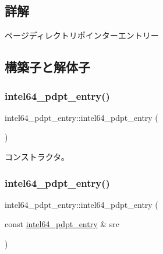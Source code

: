 \subsection{詳解}
ページディレクトリポインターエントリー 

\subsection{構築子と解体子}
\hypertarget{classintel64__pdpt__entry_a1bca60c1d1f0d72fa78c039afa32ddfc}{}\label{classintel64__pdpt__entry_a1bca60c1d1f0d72fa78c039afa32ddfc} 
\subsubsection{\texorpdfstring{intel64\+\_\+pdpt\+\_\+entry()}{intel64\_pdpt\_entry()}\hspace{0.1cm}{\footnotesize\ttfamily [1/3]}}
{\footnotesize\ttfamily intel64\+\_\+pdpt\+\_\+entry\+::intel64\+\_\+pdpt\+\_\+entry (\begin{DoxyParamCaption}{ }\end{DoxyParamCaption})}

コンストラクタ。 \hypertarget{classintel64__pdpt__entry_aa8a51fe2f1c551dd8a545aa7aa07374c}{}\label{classintel64__pdpt__entry_aa8a51fe2f1c551dd8a545aa7aa07374c} 
\subsubsection{\texorpdfstring{intel64\+\_\+pdpt\+\_\+entry()}{intel64\_pdpt\_entry()}\hspace{0.1cm}{\footnotesize\ttfamily [2/3]}}
{\footnotesize\ttfamily intel64\+\_\+pdpt\+\_\+entry\+::intel64\+\_\+pdpt\+\_\+entry (\begin{DoxyParamCaption}\item[{const \hyperlink{classintel64__pdpt__entry}{intel64\+\_\+pdpt\+\_\+entry} \&}]{src }\end{DoxyParamCaption})\hspace{0.3cm}{\ttfamily [delete]}}

